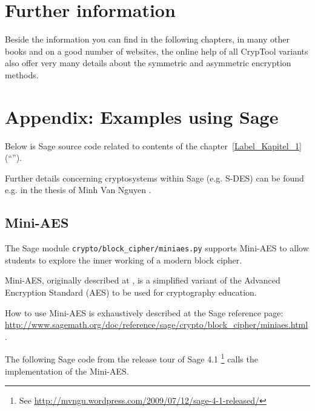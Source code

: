 \section{Further information}

Beside the information you can find in the following chapters, in many other
books and on a good number of websites, the online help of all
CrypTool variants also offer very many details about the 
symmetric and asymmetric encryption methods.


	

\newpage
\hypertarget{CM_Appendix_SageCode}{}
\section{Appendix: Examples using Sage}
\label{CM_Sage_samples}

\noindent Below is Sage source code related to contents of the
chapter~\ref{Label_Kapitel_1} (``''). 

Further details concerning cryptosystems within Sage (e.g. S-DES) can be
found e.g. in the thesis of Minh Van Nguyen \cite{cm:Nguyen2009}.

\subsection{Mini-AES}
\label{CM_Sage_Mini-AES}

The Sage module \texttt{crypto/block\_cipher/miniaes.py} supports Mini-AES to allow
students to explore the inner working of a modern block cipher.

Mini-AES, originally described at \cite{cm:Phan2002}, is a simplified variant of the
Advanced Encryption Standard (AES) to be used for cryptography education.

How to use Mini-AES is exhaustively described at the Sage reference page:\\
\url{http://www.sagemath.org/doc/reference/sage/crypto/block_cipher/miniaes.html}.

The following Sage code from the release tour of Sage 4.1%
\footnote{
See \url{http://mvngu.wordpress.com/2009/07/12/sage-4-1-released/}
}
calls the implementation of the Mini-AES.

